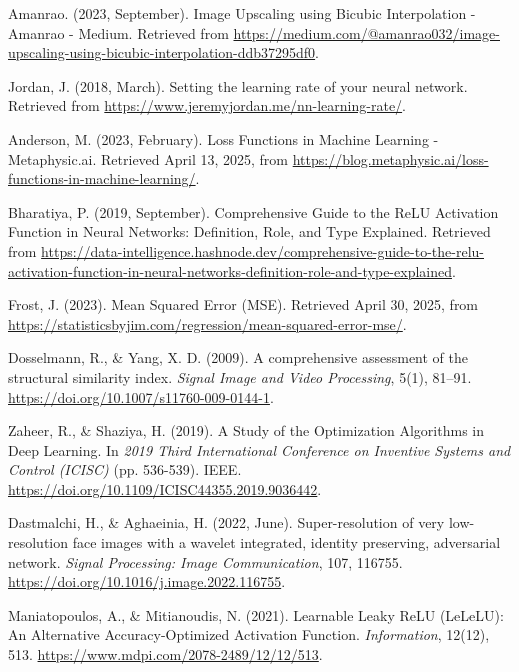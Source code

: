 \documentclass[twocolumn]{article}
\begin{document}
\begin{thebibliography}{99}
     Amanrao. (2023, September). Image Upscaling using Bicubic Interpolation - Amanrao - Medium. Retrieved from \url{https://medium.com/@amanrao032/image-upscaling-using-bicubic-interpolation-ddb37295df0}.
    
     Jordan, J. (2018, March). Setting the learning rate of your neural network. Retrieved from \url{https://www.jeremyjordan.me/nn-learning-rate/}.
    
     Anderson, M. (2023, February). Loss Functions in Machine Learning - Metaphysic.ai. Retrieved April 13, 2025, from \url{https://blog.metaphysic.ai/loss-functions-in-machine-learning/}.
    
     Bharatiya, P. (2019, September). Comprehensive Guide to the ReLU Activation Function in Neural Networks: Definition, Role, and Type Explained. Retrieved from \href{https://data-intelligence.hashnode.dev/comprehensive-guide-to-the-relu-activation-function-in-neural-networks-definition-role-and-type-explained}{https://data-intelligence.hashnode.dev/comprehensive-guide-to-the-relu-activation-function-in-neural-networks-definition-role-and-type-explained}.
    
     Frost, J. (2023). Mean Squared Error (MSE). Retrieved April 30, 2025, from \url{https://statisticsbyjim.com/regression/mean-squared-error-mse/}.
    
     Dosselmann, R., \& Yang, X. D. (2009). A comprehensive assessment of the structural similarity index. \textit{Signal Image and Video Processing}, 5(1), 81–91. \url{https://doi.org/10.1007/s11760-009-0144-1}.
    
     Zaheer, R., \& Shaziya, H. (2019). A Study of the Optimization Algorithms in Deep Learning. In \textit{2019 Third International Conference on Inventive Systems and Control (ICISC)} (pp. 536-539). IEEE. \url{https://doi.org/10.1109/ICISC44355.2019.9036442}.
    
     Dastmalchi, H., \& Aghaeinia, H. (2022, June). Super-resolution of very low-resolution face images with a wavelet integrated, identity preserving, adversarial network. \textit{Signal Processing: Image Communication}, 107, 116755. \url{https://doi.org/10.1016/j.image.2022.116755}.
    
     Maniatopoulos, A., \& Mitianoudis, N. (2021). Learnable Leaky ReLU (LeLeLU): An Alternative Accuracy-Optimized Activation Function. \textit{Information}, 12(12), 513. \url{https://www.mdpi.com/2078-2489/12/12/513}.
    

\end{thebibliography}
\end{document}

